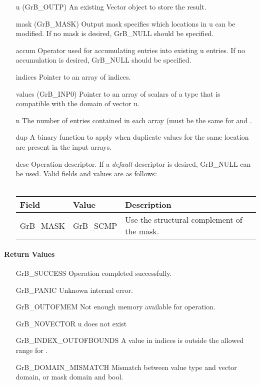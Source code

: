 \begin{itemize}[leftmargin=1.1in]
    \item[{\sf u}]       ({\sf GrB\_OUTP}) An existing Vector object to store the result.
    \item[{\sf mask}]    ({\sf GrB\_MASK}) Output mask specifies which locations in
                         {\sf u} can be modified.  If no mask is desired,
                         {\sf GrB\_NULL} should be specified.
    \item[{\sf accum}]   Operator used for accumulating entries into existing
                         {\sf u} entries. If no accumulation is desired,
                         {\sf GrB\_NULL} should be specified.
    \item[{\sf indices}] Pointer to an array of indices. 
    \item[{\sf values}]  ({\sf GrB\_INP0}) Pointer to an array of scalars of a type that
                                     is compatible with the domain of vector {\sf u}.
    \item[{\sf n}]       The number of entries contained in each array (must be the same for  and .
    \item[{\sf dup}]     A binary function to apply when duplicate values for
                         the same location are present in the input arrays.
    \item[{\sf desc}]    Operation descriptor. If a
    \emph{default} descriptor is desired, {\sf GrB\_NULL} can be
    used.  Valid fields and values are as follows: \\ ~\\
    \begin{tabular}{llp{3in}}
      Field  & Value & Description \\
      \hline
      {\sf GrB\_MASK} & {\sf GrB\_SCMP}   & Use the structural complement of the mask. \\
    \end{tabular}
\end{itemize}

\paragraph{Return Values}

\begin{itemize}[leftmargin=2.1in]
    \item[{\sf GrB\_SUCCESS}]     Operation completed successfully.
    \item[{\sf GrB\_PANIC}]            Unknown internal error.
    \item[{\sf GrB\_OUTOFMEM}]    Not enough memory available for operation.
    \item[{\sf GrB\_NOVECTOR}]      {\sf u} does not exist
    \item[{\sf GrB\_INDEX\_OUTOFBOUNDS}]
                            A value in {\sf indices} is outside the allowed range for .
    \item[\sf GrB\_DOMAIN\_MISMATCH]  
                       Mismatch between value type and vector domain, or mask domain and {\sf bool}.
\end{itemize}

